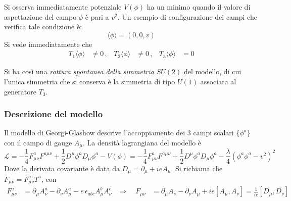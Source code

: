 Si osserva immediatamente potenziale $V(\phi)$ ha un minimo quando il valore di
aspettazione del campo $\phi$ è pari a $v^2$. Un esempio di configurazione dei
campi che verifica tale condizione è:
   $$ \langle \phi \rangle = (0,0,v) $$
Si vede immediatamente che
\begin{equation}
   \begin{aligned}
      T_1 \langle \phi \rangle & \neq 0 \, , &
      T_2 \langle \phi \rangle & \neq 0 \, , &
      T_3 \langle \phi \rangle & = 0
   \end{aligned}
\end{equation}

Si ha così una \emph{rottura spontanea della simmetria} $SU(2)$ del modello, di cui l'unica
simmetria che si conserva è la simmetria di tipo $U(1)$ associata al generatore $T_3$.\\
\subsubsection{Descrizione del modello}
Il modello di Georgi-Glashow descrive l'accoppiamento dei 3 campi scalari
$\{\phi^a\}$ con il campo di gauge $A_\mu$. La densità lagrangiana del modello è
\begin{equation}
   \mathcal{L} = - \frac{1}{4} F^a_{\mu\nu}F^{a\mu\nu}
                 + \frac{1}{2} D^\mu\phi^a D_\mu \phi^a - V(\phi)
               = - \frac{1}{4} F^a_{\mu\nu}F^{a\mu\nu}
                 + \frac{1}{2} D^\mu\phi^a D_\mu \phi^a
                 - \frac{\lambda}{4}( \phi^a\phi^a - v^2 )^2
\end{equation}
Dove la derivata covariante è data da $D_\mu = \partial _\mu + ie A_\mu$.
Si richiama che $F_{\mu\nu} = F^a_{\mu\nu} T^a$, con
\begin{equation}
   \begin{aligned}
   F^a_{\mu\nu} & = \partial _\mu A_\nu^a - \partial _\nu A^a_\mu
                   - e \, \epsilon_{abc} A_\mu^b A_\nu^c
   & \Rightarrow \quad
   F_{\mu\nu}  & = \partial _\mu A_\nu - \partial _\nu A_\mu + ie [A_\mu,A_\nu]
                = \frac{1}{ie}[D_\mu , D_\nu]
  \end{aligned}
\end{equation}

